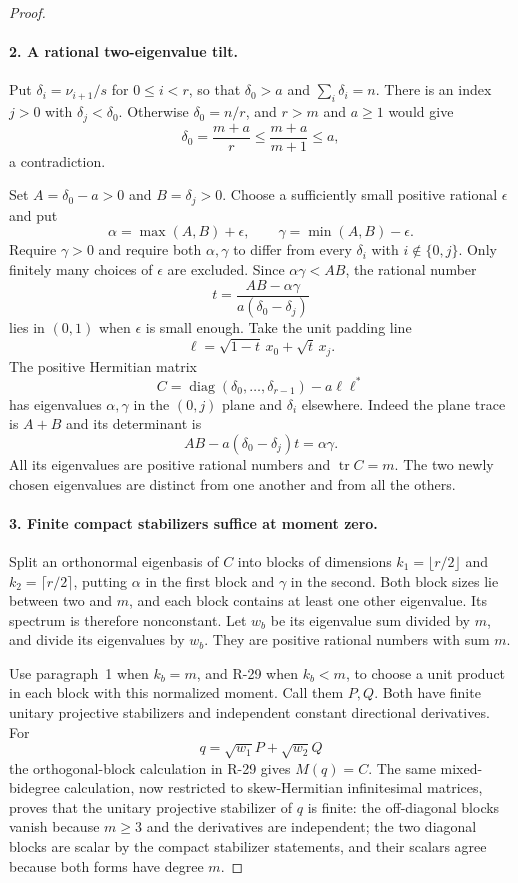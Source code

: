 \begin{proof}
\paragraph{2. A rational two-eigenvalue tilt.}
Put $\delta_i=\nu_{i+1}/s$ for $0\leq i<r$, so that
$\delta_0>a$ and $\sum_i\delta_i=n$. There is an index $j>0$
with $\delta_j<\delta_0$. Otherwise $\delta_0=n/r$, and
$r>m$ and $a\geq1$ would give
\[
 \delta_0=\frac{m+a}{r}\leq\frac{m+a}{m+1}\leq a,
\]
a contradiction.

Set $A=\delta_0-a>0$ and $B=\delta_j>0$. Choose a sufficiently
small positive rational $\epsilon$ and put
\[
 \alpha=\max(A,B)+\epsilon,\qquad
 \gamma=\min(A,B)-\epsilon.
\]
Require $\gamma>0$ and require both $\alpha,\gamma$ to differ
from every $\delta_i$ with $i\notin\{0,j\}$. Only finitely
many choices of $\epsilon$ are excluded. Since
$\alpha\gamma<AB$, the rational number
\[
 t=\frac{AB-\alpha\gamma}{a(\delta_0-\delta_j)}
\]
lies in $(0,1)$ when $\epsilon$ is small enough. Take the unit
padding line
\[
 \ell=\sqrt{1-t}\,x_0+\sqrt t\,x_j.
\]
The positive Hermitian matrix
\begin{equation}\label{R30:C}
 C=\operatorname{diag}(\delta_0,\ldots,\delta_{r-1})
                                      -a\ell\ell^*
\end{equation}
has eigenvalues $\alpha,\gamma$ in the $(0,j)$ plane and
$\delta_i$ elsewhere. Indeed the plane trace is $A+B$
and its determinant is
\[
 AB-a(\delta_0-\delta_j)t=\alpha\gamma.
\]
All its eigenvalues are positive rational numbers and
$\operatorname{tr}C=m$. The two newly chosen eigenvalues
are distinct from one another and from all the others.

\paragraph{3. Finite compact stabilizers suffice at moment zero.}
Split an orthonormal eigenbasis of $C$ into blocks of dimensions
$k_1=\lfloor r/2\rfloor$ and $k_2=\lceil r/2\rceil$,
putting $\alpha$ in the first block and $\gamma$ in the second.
Both block sizes lie between two and $m$, and each block
contains at least one other eigenvalue. Its spectrum is
therefore nonconstant. Let $w_b$ be its eigenvalue sum divided
by $m$, and divide its eigenvalues by $w_b$. They are positive
rational numbers with sum $m$.

Use paragraph~1 when $k_b=m$, and R-29 when $k_b<m$, to
choose a unit product in each block with this normalized
moment. Call them $P,Q$. Both have finite unitary projective
stabilizers and independent constant directional derivatives.
For
\[
 q=\sqrt{w_1}P+\sqrt{w_2}Q
\]
the orthogonal-block calculation in R-29 gives $M(q)=C$.
The same mixed-bidegree calculation, now restricted to
skew-Hermitian infinitesimal matrices, proves that the unitary
projective stabilizer of $q$ is finite: the off-diagonal blocks
vanish because $m\geq3$ and the derivatives are independent;
the two diagonal blocks are scalar by the compact stabilizer
statements, and their scalars agree because both forms have
degree $m$.


\end{proof}
